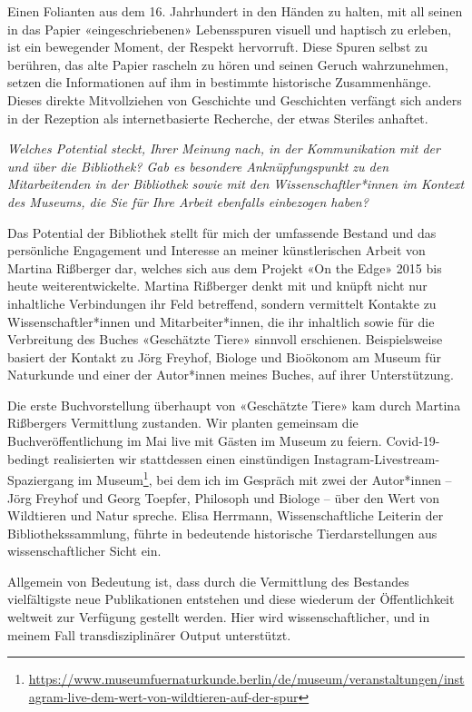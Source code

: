 \documentclass[a4paper,
fontsize=11pt,
oneside,
numbers=noperiodatend,
parskip=half-,
bibliography=totoc,
final
]{scrartcl}
\begin{document}
Einen Folianten aus dem 16. Jahrhundert in den Händen zu halten, mit all
seinen in das Papier «eingeschriebenen» Lebensspuren visuell und
haptisch zu erleben, ist ein bewegender Moment, der Respekt hervorruft.
Diese Spuren selbst zu berühren, das alte Papier rascheln zu hören und
seinen Geruch wahrzunehmen, setzen die Informationen auf ihm in
bestimmte historische Zusammenhänge. Dieses direkte Mitvollziehen von
Geschichte und Geschichten verfängt sich anders in der Rezeption als
internetbasierte Recherche, der etwas Steriles anhaftet.

\emph{Welches Potential steckt, Ihrer Meinung nach, in der Kommunikation
mit der und über die Bibliothek? Gab es besondere Anknüpfungspunkt zu
den Mitarbeitenden in der Bibliothek sowie mit den Wissenschaftler*innen
im Kontext des Museums, die Sie für Ihre Arbeit ebenfalls einbezogen
haben?}

Das Potential der Bibliothek stellt für mich der umfassende Bestand und
das persönliche Engagement und Interesse an meiner künstlerischen Arbeit
von Martina Rißberger dar, welches sich aus dem Projekt «On the Edge»
2015 bis heute weiterentwickelte. Martina Rißberger denkt mit und knüpft
nicht nur inhaltliche Verbindungen ihr Feld betreffend, sondern
vermittelt Kontakte zu Wissenschaftler*innen und Mitarbeiter*innen, die
ihr inhaltlich sowie für die Verbreitung des Buches «Geschätzte Tiere»
sinnvoll erschienen. Beispielsweise basiert der Kontakt zu Jörg Freyhof,
Biologe und Bioökonom am Museum für Naturkunde und einer der Autor*innen
meines Buches, auf ihrer Unterstützung.

Die erste Buchvorstellung überhaupt von «Geschätzte Tiere» kam durch
Martina Rißbergers Vermittlung zustanden. Wir planten gemeinsam die
Buchveröffentlichung im Mai live mit Gästen im Museum zu feiern.
Covid-19-bedingt realisierten wir stattdessen einen einstündigen
Instagram-Livestream-Spaziergang im Museum\footnote{\url{https://www.museumfuernaturkunde.berlin/de/museum/veranstaltungen/instagram-live-dem-wert-von-wildtieren-auf-der-spur}},
bei dem ich im Gespräch mit zwei der Autor*innen -- Jörg Freyhof und
Georg Toepfer, Philosoph und Biologe -- über den Wert von Wildtieren und
Natur spreche. Elisa Herrmann, Wissenschaftliche Leiterin der
Bibliothekssammlung, führte in bedeutende historische Tierdarstellungen
aus wissenschaftlicher Sicht ein.

Allgemein von Bedeutung ist, dass durch die Vermittlung des Bestandes
vielfältigste neue Publikationen entstehen und diese wiederum der
Öffentlichkeit weltweit zur Verfügung gestellt werden. Hier wird
wissenschaftlicher, und in meinem Fall transdisziplinärer Output
unterstützt.
\end{document}
